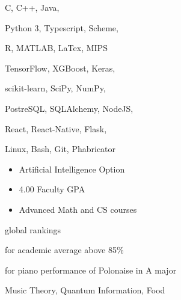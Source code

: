 C, C++, Java,
\smallskip

Python 3, Typescript, Scheme,
\smallskip

R, MATLAB, LaTex, MIPS

\divider\smallskip

TensorFlow, XGBoost, Keras,
\smallskip

scikit-learn, SciPy, NumPy,
\smallskip

PostreSQL, SQLAlchemy, NodeJS,
\smallskip

React, React-Native, Flask,

\divider\smallskip

Linux, Bash, Git, Phabricator


\begin{itemize}
    \item Artificial Intelligence Option
    \item 4.00 Faculty GPA
    \item Advanced Math and CS courses
\end{itemize}


global rankings

\divider\smallskip

for academic average above 85\%

\divider\smallskip

for piano performance of Polonaise in A major

\divider\smallskip


Music Theory, Quantum Information, Food

